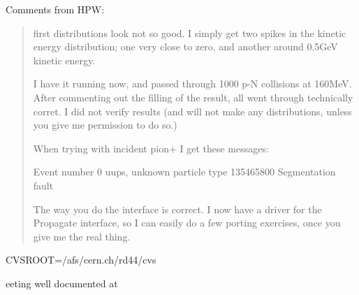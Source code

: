 Comments from HPW:
\begin{quotation} 

  
  first distributions look not so good. I simply get two spikes in the
  kinetic energy distribution; one very close to zero, and another
  around 0.5GeV kinetic energy.
  
  I have it running now, and passed through 1000 p-N collisions at
  160MeV.  After commenting out the filling of the result, all went
  through technically corret.  I did not verify results (and will not
  make any distributions, unless you give me permission to do so.)
 
  When trying with incident pion+ I get these messages:
 
  Event number 0 uups, unknown particle type 135465800 Segmentation
  fault

                          
  The way you do the interface is correct.  I now have a driver for
  the Propagate interface, so I can easily do a few porting exercises,
  once you give me the real thing.

\end{quotation}


CVSROOT=/afs/cern.ch/rd44/cvs

eeting well documented at 
\scriptsize

